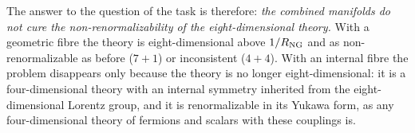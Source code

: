 The answer to the question of the task is therefore: \emph{the combined manifolds do not cure the
non-renormalizability of the eight-dimensional theory.} With a geometric fibre the theory is
eight-dimensional above $1/R_{\rm NG}$ and as non-renormalizable as before ($7+1$) or inconsistent
($4+4$). With an internal fibre the problem disappears only because the theory is no longer
eight-dimensional: it is a four-dimensional theory with an internal symmetry inherited from the
eight-dimensional Lorentz group, and it is renormalizable in its Yukawa form, as any four-dimensional
theory of fermions and scalars with these couplings is.
